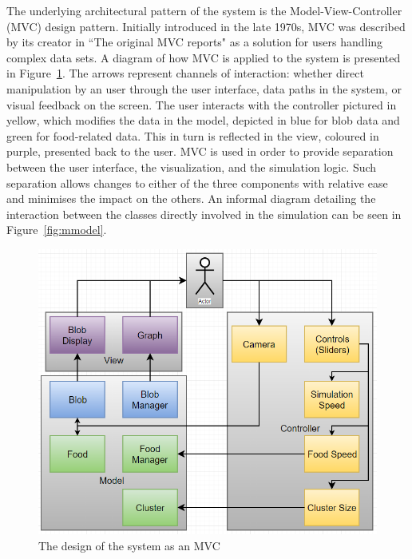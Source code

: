 The underlying architectural pattern of the system is the Model-View-Controller (MVC) design pattern. Initially introduced in the late 1970s, MVC was described by its creator in ``The original MVC reports"\cite{reenskaug1979original} as a solution for users handling complex data sets. A diagram of how MVC is applied to the system is presented in Figure~\ref{fig:mvc}. The arrows represent channels of interaction: whether direct manipulation by an user through the user interface, data paths in the system, or visual feedback on the screen. The user interacts with the controller pictured in yellow, which modifies the data in the model, depicted in blue for blob data and green for food-related data. This in turn is reflected in the view, coloured in purple, presented back to the user. MVC is used in order to provide separation between the user interface, the visualization, and the simulation logic. Such separation allows changes to either of the three components with relative ease and minimises the impact on the others. An informal diagram detailing the interaction between the classes directly involved in the simulation can be seen in Figure~\ref{fig:mmodel}.

\begin{figure}[!th]
	\centering
	\includegraphics[scale=0.6]{images/mvc}
	\caption{\label{fig:mvc}The design of the system as an MVC}
\end{figure}

